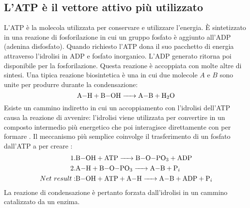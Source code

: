 \subsection{L'ATP \`e il vettore attivo pi\`u utilizzato}
L'ATP \`e la molecola utilizzata per conservare e utilizzare l'energia. \`E sintetizzato in una reazione di fosforilazione in cui un gruppo fosfato \`e aggiunto all'ADP (adenina 
disfosfato). Quando richiesto l'ATP dona il suo pacchetto di energia attraverso l'idrolisi in ADP e fosfato inorganico. L'ADP generato ritorna poi disponibile per la fosforilazione. 
Questa reazione \`e accoppiata con molte altre di sintesi. Una tipica reazione biosintetica \`e una in cui due molecole $A$ e $B$ sono unite per produrre  durante la 
condensazione: 
$$\ce{A-H + B-OH -> A-B + H2O}$$
Esiste un cammino indiretto in cui un accoppiamento con l'idrolisi dell'ATP causa la reazione di avvenire: l'idrolisi viene utilizzata per convertire  in un composto 
intermedio pi\`u energetico che poi interagisce direttamente con  per formare . Il meccanismo pi\`u semplice coinvolge il trasferimento di un fosfato dall'ATP a 
per creare :
\begin{align*}
	1. & \ce{B-OH + ATP  ->  B-O-PO_3 + ADP}\\
	2. & \ce{A-H + B-O-PO_3 -> A-B + P_i}\\
	Net\ result: & \ce{B-OH + ATP + A-H  ->   A-B + ADP + P_i}\\
\end{align*}
La reazione di condensazione \`e pertanto forzata dall'idrolisi in un cammino catalizzato da un enzima. 
